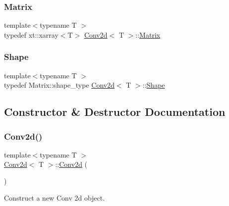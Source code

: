 \subsubsection{\texorpdfstring{Matrix}{Matrix}}
{\footnotesize\ttfamily template$<$typename T $>$ \\
typedef xt\+::xarray$<$T$>$ \mbox{\hyperlink{class_conv2d}{Conv2d}}$<$ T $>$\+::\mbox{\hyperlink{class_conv2d_a8263e2f2c46243e39fbca5712603c0fd}{Matrix}}}

\mbox{\label{class_conv2d_a78480f9c798b598a0bda9eadb1731225}} 
\subsubsection{\texorpdfstring{Shape}{Shape}}
{\footnotesize\ttfamily template$<$typename T $>$ \\
typedef Matrix\+::shape\+\_\+type \mbox{\hyperlink{class_conv2d}{Conv2d}}$<$ T $>$\+::\mbox{\hyperlink{class_conv2d_a78480f9c798b598a0bda9eadb1731225}{Shape}}}



\subsection{Constructor \& Destructor Documentation}
\mbox{\label{class_conv2d_ae28c4831d44bdf769768f29b9892e5d2}} 
\subsubsection{\texorpdfstring{Conv2d()}{Conv2d()}\hspace{0.1cm}{\footnotesize\ttfamily [1/2]}}
{\footnotesize\ttfamily template$<$typename T $>$ \\
\mbox{\hyperlink{class_conv2d}{Conv2d}}$<$ T $>$\+::\mbox{\hyperlink{class_conv2d}{Conv2d}} (\begin{DoxyParamCaption}{ }\end{DoxyParamCaption})\hspace{0.3cm}{\ttfamily [default]}}



Construct a new Conv 2d object. 

\mbox{\label{class_conv2d_a78911057f811daadff49ec744f063e3c}} 
